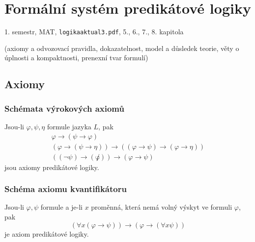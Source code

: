 \documentclass[a4paper, 11pt]{report}
\begin{document}
\chapter{Formální systém predikátové logiky} \label{cha:7}

1. semestr, MAT, \texttt{logikaaktual3.pdf}, 5., 6., 7., 8. kapitola

(axiomy a odvozovací pravidla, dokazatelnost, model a důsledek teorie, věty o úplnosti a kompaktnosti, prenexní tvar formulí)

\section{Axiomy}


\subsection{Schémata výrokových axiomů}

Jsou-li $\varphi, \psi, \eta$ formule jazyka $L$, pak
\begin{eqnarray*}
&\varphi \to (\psi \to \varphi) & \\
&(\varphi \to (\psi \to \eta)) \to ((\varphi \to \psi) \to (\varphi \to \eta)) & \\
&((\lnot \psi) \to (\not \varphi)) \to (\varphi \to \psi) & 
\end{eqnarray*}
jsou axiomy predikátové logiky.

\subsection{Schéma axiomu kvantifikátoru}
Jsou-li $\varphi, \psi$ formule a je-li $x$ proměnná, která nemá volný výskyt ve formuli $\varphi$, pak
$$ (\forall x (\varphi \to \psi)) \to (\varphi \to (\forall x \psi)) $$
je axiom predikátové logiky.
\end{document}
